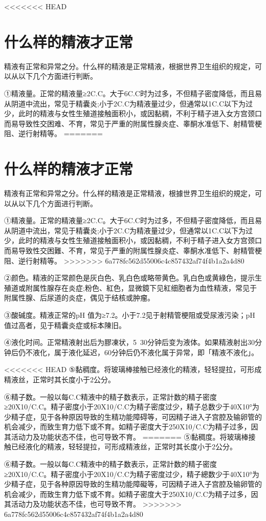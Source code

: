 \documentclass[12pt,UTF8]{ctexbook}
\begin{document}
<<<<<<< HEAD
\section{什么样的精液才正常}

精液有正常和异常之分。什么样的精液是正常精液，根据世界卫生组织的规定，可以从以下几个方面进行判断。

①精液量。正常的精液量≥2C.C。大于6C.C时为过多，不但精子密度降低，而且易从阴道中流出，常见于精囊炎;小于2C.C为精液量过少，但通常以1C.C以下为过少，此时的精液与女性生殖道接触面积小，或因黏稠，不利于精子进入女方宫颈口而易导致性交困难、不育，常见于严重的附属性腺炎症、睾酮水准低下、射精管梗阻、逆行射精等。
=======
\section{什么样的精液才正常}

精液有正常和异常之分。什么样的精液是正常精液，根據世界卫生组织的規定，可以从以下几个方面进行判断。

①精液量。正常的精液量≥2C.C。大于6C.C时为过多，不但精子密度降低，而且易从阴道中流出，常见于精囊炎;小于2C.C为精液量过少，但通常以1C.C以下为过少，此时的精液与女性生殖道接触面积小，或因黏稠，不利于精子进入女方宫颈口而易导致性交困難、不育，常见于严重的附属性腺炎症、睾酮水准低下、射精管梗阻、逆行射精等。
>>>>>>> 6a778fc562d55006c4c857432af74f4b1a2a4d80

②颜色。精液的正常颜色是灰白色、乳白色或略带黄色。乳白色或黄綠色，提示生殖道或附属性腺存在炎症;粉色、紅色，显微鏡下见紅细胞者为血性精液，常见于附属性腺、后尿道的炎症，偶见于结核或肿瘤。

③酸碱度。精液正常的pH 值为≥7.2。小于7.2见于射精管梗阻或受尿液污染；pH值过高者，见于精囊炎症或标本陳旧。

④液化时间。正常精液射出后为膠凍状，5~30分钟后变为液体。如果精液射出30分钟后仍不液化，属于液化延迟，60分钟后仍不液化属于异常，即「精液不液化」。

<<<<<<< HEAD
⑤黏稠度。将玻璃棒接触已经液化的精液，轻轻提拉，可形成精液丝，正常时其长度小于2公分。

⑥精子数。一般以每C.C精液中的精子数表示，正常計数的精子密度≥20X10/C.C。精子密度小于20X10/C.C为精子密度过少，精子总数少于40X10°为少精子症，见于各种原因导致的生精功能障碍等，可因精子进入子宫腔及输卵管的机会减少，而致生育力低下或不育。如精子密度大于250X10/C.C为精子过多，因其活动力及功能状态不佳，也可导致不育。
=======
⑤黏稠度。将玻璃棒接触已经液化的精液，轻轻提拉，可形成精液丝，正常时其长度小于2公分。

⑥精子数。一般以每C.C精液中的精子数表示，正常計数的精子密度≥20X10/C.C。精子密度小于20X10/C.C为精子密度过少，精子總数少于40X10°为少精子症，见于各种原因导致的生精功能障礙等，可因精子进入子宫腔及输卵管的机会减少，而致生育力低下或不育。如精子密度大于250X10/C.C为精子过多，因其活动力及功能状态不佳，也可导致不育。
>>>>>>> 6a778fc562d55006c4c857432af74f4b1a2a4d80
\end{document}
